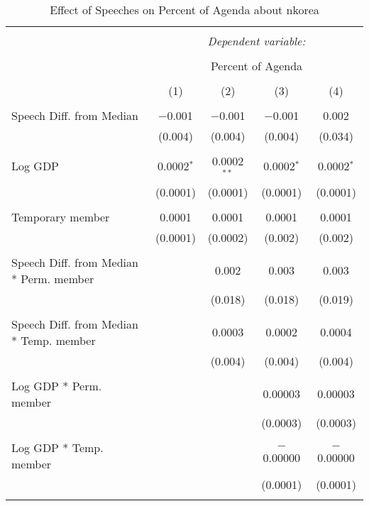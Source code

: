 
\begin{table}[!htbp] \centering 
  \caption{Effect of Speeches on Percent of Agenda about nkorea} 
  \label{} 
\begin{tabular}{@{\extracolsep{5pt}}lcccc} 
\\[-1.8ex]\hline 
\hline \\[-1.8ex] 
 & \multicolumn{4}{c}{\textit{Dependent variable:}} \\ 
\cline{2-5} 
\\[-1.8ex] & \multicolumn{4}{c}{Percent of Agenda} \\ 
\\[-1.8ex] & (1) & (2) & (3) & (4)\\ 
\hline \\[-1.8ex] 
 Speech Diff. from Median & $-$0.001 & $-$0.001 & $-$0.001 & 0.002 \\ 
  & (0.004) & (0.004) & (0.004) & (0.034) \\ 
  & & & & \\ 
 Log GDP & 0.0002$^{*}$ & 0.0002$^{**}$ & 0.0002$^{*}$ & 0.0002$^{*}$ \\ 
  & (0.0001) & (0.0001) & (0.0001) & (0.0001) \\ 
  & & & & \\ 
 Temporary member & 0.0001 & 0.0001 & 0.0001 & 0.0001 \\ 
  & (0.0001) & (0.0002) & (0.002) & (0.002) \\ 
  & & & & \\ 
 Speech Diff. from Median * Perm. member &  & 0.002 & 0.003 & 0.003 \\ 
  &  & (0.018) & (0.018) & (0.019) \\ 
  & & & & \\ 
 Speech Diff. from Median * Temp. member &  & 0.0003 & 0.0002 & 0.0004 \\ 
  &  & (0.004) & (0.004) & (0.004) \\ 
  & & & & \\ 
 Log GDP * Perm. member &  &  & 0.00003 & 0.00003 \\ 
  &  &  & (0.0003) & (0.0003) \\ 
  & & & & \\ 
 Log GDP * Temp. member &  &  & $-$0.00000 & $-$0.00000 \\ 
  &  &  & (0.0001) & (0.0001) \\ 
  & & & & \\ 

\end{tabular}
\end{table}

